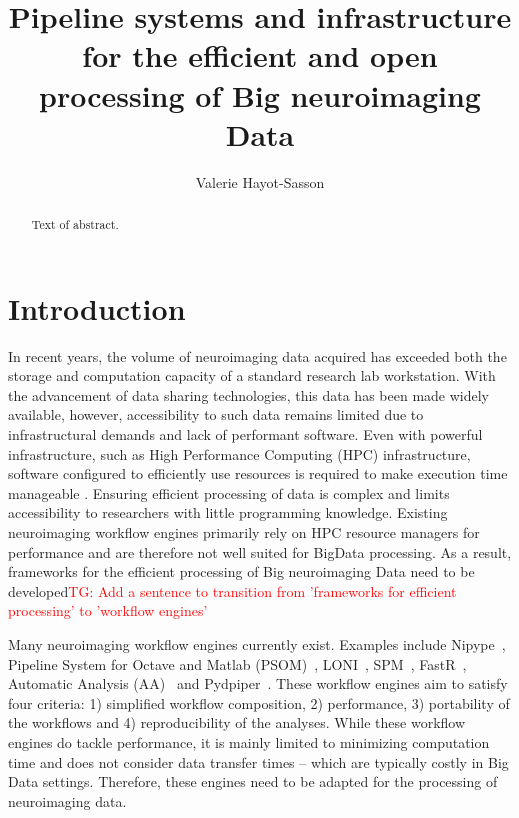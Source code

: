 \documentclass{report}
\newcommand{\tristan}[1]{\textcolor{red}{TG: #1}}
\begin{document}
 
    \title{Pipeline systems and infrastructure for the efficient
            and open processing of Big neuroimaging Data} 
    \author{Valerie Hayot-Sasson}
    \maketitle 
    
    \begin{abstract} Text of abstract.  
    \end{abstract} 
    \tableofcontents
    \chapter{Introduction}
        In recent years, the volume of neuroimaging data acquired has exceeded
        both the storage and computation capacity of a standard research 
        lab workstation. With the advancement of data sharing technologies, 
        this data has been made widely available, however, accessibility to 
        such data remains limited due to infrastructural demands and lack of 
        performant software. Even with powerful infrastructure, such as High
        Performance Computing (HPC) infrastructure, software configured to 
        efficiently use resources is required to make execution time manageable
        . Ensuring efficient processing of data is 
        complex and limits accessibility to researchers with little programming 
        knowledge. Existing neuroimaging workflow engines primarily rely on HPC
        resource managers for performance and are therefore not well suited for
        BigData processing. As a result, frameworks for the efficient 
        processing of Big neuroimaging Data need to be developed\tristan{Add a sentence to transition from 'frameworks for efficient processing' to 'workflow engines'}
        
        Many neuroimaging workflow engines currently exist. Examples include
        Nipype~\cite{nipype}, Pipeline System for Octave and Matlab 
        (PSOM)~\cite{10.3389/fninf.2012.00007}, LONI~\cite{REX20031033}, 
        SPM~\cite{spm}, FastR~\cite{10.3389/fict.2016.00015},
        Automatic Analysis (AA)~\cite{10.3389/fninf.2014.00090} and 
        Pydpiper~\cite{10.3389/fninf.2014.00067}. These 
        workflow engines aim to satisfy four criteria: 1) simplified
        workflow composition, 2) performance, 3) portability of the workflows 
        and 4) reproducibility of the analyses. While these workflow engines
        do tackle performance, it is mainly limited to minimizing computation
        time and does not consider data transfer times -- which are typically
        costly in Big Data settings. Therefore, these engines need to be adapted
        for the processing of neuroimaging data.
\end{document}

